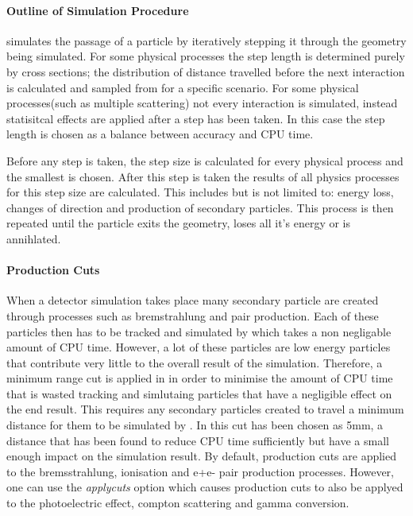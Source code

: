 \paragraph{Outline of \geant Simulation Procedure} \label{sec:steps}
\geant simulates the passage of a particle by iteratively stepping it through the geometry being simulated.  For some physical processes the step length is determined purely by cross sections; the distribution of distance travelled before the next interaction is calculated and sampled from for a specific scenario.  For some physical processes(such as multiple scattering) not every interaction is simulated, instead statisitcal effects are applied after a step has been taken.  In this case the step length is chosen as a balance between accuracy and CPU time.

Before any step is taken, the step size is calculated for every physical process and the smallest is chosen.  After this step is taken the results of all physics processes for this step size are calculated.  This includes but is not limited to: energy loss, changes of direction and production of secondary particles.  This process is then repeated until the particle exits the geometry, loses all it's energy or is annihlated.

\paragraph{Production Cuts}\label{sec:products}When a detector simulation takes place many secondary particle are created through processes such as bremstrahlung and pair production.  Each of these particles then has to be tracked and simulated by \geant which takes a non negligable amount of CPU time. However, a lot of these particles are low energy particles that contribute very little to the overall result of the simulation.  Therefore, a minimum range cut is applied in \geant in order to minimise the amount of CPU time that is wasted tracking and simlutaing particles that have a negligible effect on the end result.  This requires any secondary particles created to travel a minimum distance for them to be simulated by \geant.  In \lhcb this cut has been chosen as 5mm, a distance that has been found to reduce CPU time sufficiently but have a small enough impact on the simulation result. By default, production cuts are applied to the bremsstrahlung, ionisation and e+e- pair production processes.  However, one can use the \textit{applycuts} option which causes production cuts to also be applyed to the photoelectric effect, compton scattering and gamma conversion.

